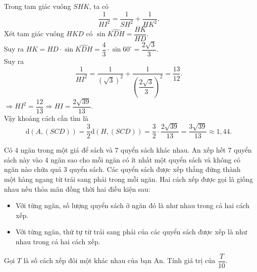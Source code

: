 \begin{ex}
{		Trong tam giác vuông $SHK$, ta có
		$$\dfrac{1}{HI^2} = \dfrac{1}{SH^2} + \dfrac{1}{HK^2}.$$
		Xét tam giác vuông $HKD$ có $\sin \widehat{KDH} = \dfrac{HK}{HD}$.\\
		Suy ra $HK=HD\cdot \sin \widehat{KDH} =\dfrac43\cdot \sin 60^\circ=\dfrac{2\sqrt3}{3}$.\\ 
		Suy ra
		$$\dfrac{1}{HI^2} = \dfrac{1}{\left(\sqrt{3}\right)^2} + \dfrac{1}{\left(\dfrac{2\sqrt{3}}{3}\right)^2} = \dfrac{13}{12}.$$
		$\Rightarrow HI^2 = \dfrac{12}{13} \Rightarrow HI =  \dfrac{2\sqrt{39}}{13}$.
		\\
		Vậy khoảng cách cần tìm là
		$$\mathrm{d}(A, (SCD)) = \dfrac{3}{2} \mathrm{d}(H, (SCD)) = \dfrac{3}{2} \cdot \dfrac{2\sqrt{39}}{13} = \dfrac{3\sqrt{39}}{13}\approx 1{,}44 .$$
	}
\end{ex}
\begin{ex}%
	Có $4$ ngăn trong một giá để sách và $7$ quyển sách khác nhau. An xếp hết $7$ quyển sách này vào $4$ ngăn sao cho mỗi ngăn có ít nhất một quyển sách và không có ngăn nào chứa quá $3$ quyển sách.
	Các quyển sách được xếp thẳng đứng thành một hàng ngang từ trái sang phải trong mỗi ngăn. Hai cách xếp được gọi là giống nhau nếu thỏa mãn đồng thời hai điều kiện sau:
	\begin{itemize}
		\item Với từng ngăn, số lượng quyển sách ở ngăn đó là như nhau trong cả hai cách xếp.
		\item Với từng ngăn, thứ tự từ trái sang phải của các quyển sách được xếp là như nhau trong cả hai cách xếp.
	\end{itemize}
	Gọi $T$ là số cách xếp đôi một khác nhau của bạn An. Tính giá trị của $\dfrac{T}{10}$.
\end{ex}
